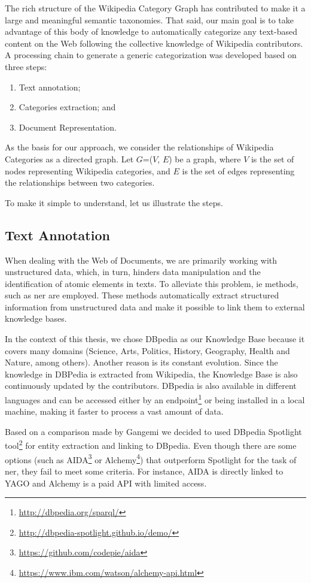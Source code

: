 The rich structure of the Wikipedia Category Graph has contributed to make it a large and meaningful semantic taxonomies. That said, our main goal is to take advantage of this body of knowledge to automatically categorize any text-based content on the Web following the collective knowledge of Wikipedia contributors. A processing chain to generate a generic categorization was developed based on three steps: 

\begin{enumerate}
\item Text annotation;
\item Categories extraction; and
\item Document Representation.

\end{enumerate}
As the basis for our approach, we consider the relationships of Wikipedia Categories as a directed graph. Let $G$=($V$, $E$) be a graph, where $V$ is the set of nodes representing Wikipedia categories, and $E$ is the set of edges representing the relationships between two categories.

To make it simple to understand, let us illustrate the steps.

\subsection{\hspace*{3pt} Text Annotation} 
\label{sec:text-annotation}
When dealing with the Web of Documents, we are primarily working with unstructured data, which, in turn, hinders data manipulation and the identification of atomic elements in texts. To alleviate this problem, \gls{ie} methods, such as \gls{ner} are employed. These methods automatically extract structured information from unstructured data and make it possible to link them to external knowledge bases. 

In the context of this thesis, we chose DBpedia as our Knowledge Base because it covers many domains (Science, Arts, Politics, History, Geography, Health and Nature, among others). Another reason is its constant evolution. Since the knowledge in DBPedia is extracted from Wikipedia,  the Knowledge Base is also continuously updated by the contributors. DBpedia is also available in different languages and can be accessed either by an endpoint\footnote{\url{http://dbpedia.org/sparql/}} or being installed in a local machine, making it faster to process a vast amount of data.

Based on a comparison made by Gangemi\cite{gangemi2013comparison} we decided to used  DBpedia Spotlight tool\footnote{\url{http://dbpedia-spotlight.github.io/demo/}} for entity extraction and linking to DBpedia. Even though there are some options (such as AIDA\footnote{\url{https://github.com/codepie/aida}} or Alchemy\footnote{\url{https://www.ibm.com/watson/alchemy-api.html}}) that outperform Spotlight for the task of \gls{ner}, they fail to meet some criteria. For instance, AIDA is directly linked to YAGO and Alchemy is a paid API with limited access.  


